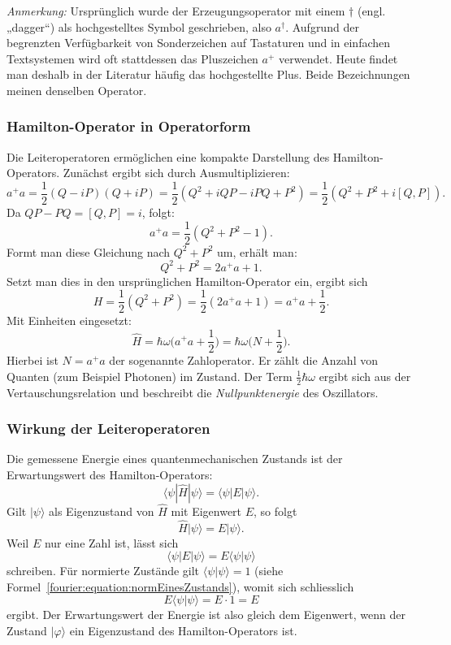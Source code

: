 \noindent
\textit{Anmerkung:}
Ursprünglich wurde der Erzeugungsoperator mit einem $\dagger$ (engl. „dagger“) als hochgestelltes Symbol geschrieben, also $a^\dagger$.
Aufgrund der begrenzten Verfügbarkeit von Sonderzeichen auf Tastaturen und in einfachen Textsystemen wird oft stattdessen das Pluszeichen $a^+$ verwendet.
Heute findet man deshalb in der Literatur häufig das hochgestellte Plus.
Beide Bezeichnungen meinen denselben Operator.

\subsubsection{Hamilton-Operator in Operatorform\label{fourier:subsubsection:HamiltonOperatorInOperatorform}}
Die Leiteroperatoren ermöglichen eine kompakte Darstellung des Hamilton-Operators.
Zunächst ergibt sich durch Ausmultiplizieren:
\[
	a^+a = \frac{1}{2}(Q - iP)(Q + iP) = \frac{1}{2}(Q^2 + iQP - iPQ + P^2) = \frac{1}{2}(Q^2 + P^2 + i[Q, P]).
\]
Da $QP - PQ = [Q, P] = i$, folgt:
\[
	a^+a = \frac{1}{2}(Q^2 + P^2 - 1).
\]
Formt man diese Gleichung nach $Q^2 + P^2$ um, erhält man:
\[
	Q^2 + P^2 = 2a^+a + 1.
\]
Setzt man dies in den ursprünglichen Hamilton-Operator ein, ergibt sich
\[
	H = \frac{1}{2}(Q^2 + P^2) = \frac{1}{2}(2a^+a + 1) = a^+a + \frac{1}{2}.
\]
Mit Einheiten eingesetzt:
\begin{equation}
	\hat{H} = \hbar\omega \biggl(a^+ a + \frac{1}{2}\biggr) = \hbar\omega \biggl(N + \frac{1}{2}\biggr).
\end{equation}
Hierbei ist $N = a^+a$ der sogenannte Zahloperator.
Er zählt die Anzahl von Quanten (zum Beispiel Photonen) im Zustand.
Der Term $\frac{1}{2}\hbar\omega$ ergibt sich aus der Vertauschungsrelation und beschreibt die \emph{Nullpunktenergie} des Oszillators.
%

\subsubsection{Wirkung der Leiteroperatoren\label{fourier:subsubsection:WirkungLeiteroperatoren}}
Die gemessene Energie eines quantenmechanischen Zustands ist der Erwartungswert des Hamilton-Operators:
\begin{equation}
	\langle\psi|\hat{H}|\psi\rangle = \langle\psi|E|\psi\rangle.
\end{equation}
Gilt $|\psi\rangle$ als Eigenzustand von $\hat{H}$ mit Eigenwert $E$, so folgt
\begin{equation}
	\hat{H}|\psi\rangle = E|\psi\rangle.
\end{equation}
Weil $E$ nur eine Zahl ist, lässt sich
\[
	\langle\psi|E|\psi\rangle = E \langle\psi|\psi\rangle
\]
schreiben.
Für normierte Zustände gilt $\langle\psi|\psi\rangle = 1$ (siehe Formel~\ref{fourier:equation:normEinesZustands}), womit sich schliesslich
\[
	E \langle\psi|\psi\rangle = E \cdot 1 = E
\]
ergibt.
Der Erwartungswert der Energie ist also gleich dem Eigenwert, wenn der Zustand $|\varphi\rangle$ ein Eigenzustand des Hamilton-Operators ist.

